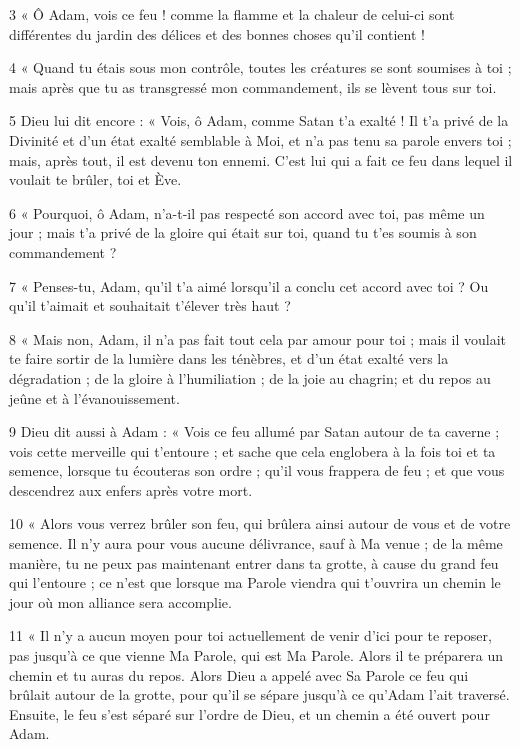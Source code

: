 \par 3 « Ô Adam, vois ce feu ! comme la flamme et la chaleur de celui-ci sont différentes du jardin des délices et des bonnes choses qu'il contient !

\par 4 « Quand tu étais sous mon contrôle, toutes les créatures se sont soumises à toi ; mais après que tu as transgressé mon commandement, ils se lèvent tous sur toi.

\par 5 Dieu lui dit encore : « Vois, ô Adam, comme Satan t'a exalté ! Il t'a privé de la Divinité et d'un état exalté semblable à Moi, et n'a pas tenu sa parole envers toi ; mais, après tout, il est devenu ton ennemi. C’est lui qui a fait ce feu dans lequel il voulait te brûler, toi et Ève.

\par 6 « Pourquoi, ô Adam, n'a-t-il pas respecté son accord avec toi, pas même un jour ; mais t'a privé de la gloire qui était sur toi, quand tu t'es soumis à son commandement ?

\par 7 « Penses-tu, Adam, qu'il t'a aimé lorsqu'il a conclu cet accord avec toi ? Ou qu'il t'aimait et souhaitait t'élever très haut ?

\par 8 « Mais non, Adam, il n'a pas fait tout cela par amour pour toi ; mais il voulait te faire sortir de la lumière dans les ténèbres, et d'un état exalté vers la dégradation ; de la gloire à l'humiliation ; de la joie au chagrin; et du repos au jeûne et à l’évanouissement.

\par 9 Dieu dit aussi à Adam : « Vois ce feu allumé par Satan autour de ta caverne ; vois cette merveille qui t'entoure ; et sache que cela englobera à la fois toi et ta semence, lorsque tu écouteras son ordre ; qu'il vous frappera de feu ; et que vous descendrez aux enfers après votre mort.

\par 10 « Alors vous verrez brûler son feu, qui brûlera ainsi autour de vous et de votre semence. Il n'y aura pour vous aucune délivrance, sauf à Ma venue ; de la même manière, tu ne peux pas maintenant entrer dans ta grotte, à cause du grand feu qui l'entoure ; ce n’est que lorsque ma Parole viendra qui t’ouvrira un chemin le jour où mon alliance sera accomplie.

\par 11 « Il n'y a aucun moyen pour toi actuellement de venir d'ici pour te reposer, pas jusqu'à ce que vienne Ma Parole, qui est Ma Parole. Alors il te préparera un chemin et tu auras du repos. Alors Dieu a appelé avec Sa Parole ce feu qui brûlait autour de la grotte, pour qu'il se sépare jusqu'à ce qu'Adam l'ait traversé. Ensuite, le feu s'est séparé sur l'ordre de Dieu, et un chemin a été ouvert pour Adam.

